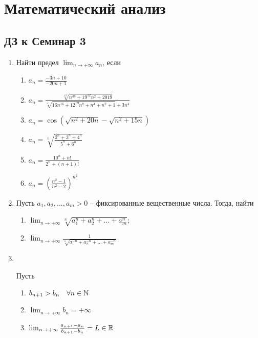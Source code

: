 \documentclass[a4paper]{article}
\begin{document}
    \section*{Математический анализ}
    \subsection*{ДЗ к Семинар 3}
    
    \begin{enumerate}
    \item 
        Найти предел $\lim_{n \to +\infty} a_n$, если

        \begin{enumerate}[label=\alph*)]
        \item $a_n = \frac{-3n + 10}{-20n + 1}$
        \item $a_n = \frac{\sqrt[12]{n^{48} + 19^{12} n^2 + 2019}}{\sqrt[4]{16n^{16} + 12^{19} n^8 + n^4 + n^2 + 1} + 3n^4}$
        \item $a_n = \cos\left(\sqrt{n^2 + 20n} - \sqrt{n^2 + 15n}\right)$
        \item $a_n = \sqrt[n]{\frac{2^n + 3^n + 4^n}{5^n + 6^n}}$
        \item $a_n = \frac{10^n + n!}{2^n + (n + 1)!}$
        \item $a_n = \left(\frac{n^2 - 1}{n^2 - 2}\right)^{n^2}$
        \end{enumerate}
    
    \item
        Пусть $a_1, a_2, \dots, a_m > 0$ -- фиксированные вещественные числа. Тогда, найти

        \begin{enumerate}[label=\alph*)]
            \item $\lim_{n \to +\infty} \sqrt[n]{a_1^n + a_2^n + \dots + a_m^n}$;
            \item $\lim_{n \to +\infty} \frac{1}{\sqrt[n]{a_1^{-n} + a_2^{-n} + \dots + a_m^{-n}}}$
        \end{enumerate}

    \item
        \
        \begin{framed}
            \begin{theorem}[Штольца]
                \label{shtolz}
                Пусть
                \begin{enumerate}[label=\alph*)]
                \item $b_{n + 1} > b_n \quad \forall n \in \mathbb{N}$
                \item $\lim_{n \to +\infty} b_n = +\infty$
                \item $\lim_{n \to +\infty} \frac{a_{n + 1} - a_n}{b_{n + 1} - b_n} = L \in \mathbb{R}$
                \end{enumerate}


\end{theorem}
\end{framed}
\end{enumerate}
\end{document}
